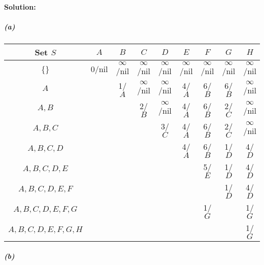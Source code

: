 \documentclass[12pt]{article}
\begin{document}
\paragraph{Solution:}
\subparagraph{(a)}

\begin{center}
\begin{tabular}{ | c | c | c | c | c | c | c | c | c |}
\hline
Set $S$ & $A$ & $B$ & $C$ & $D$ & $E$ & $F$ & $G$ & $H$ \\ \hline
\{\} & 0/nil & $\infty$/nil & $\infty$/nil & $\infty$/nil & $\infty$/nil
& $\infty$/nil & $\infty$/nil & $\infty$/nil \\ \hline
$A$ & & 1/$A$ & $\infty$/nil & $\infty$/nil & 4/$A$ & 6/$B$ & 6/$B$ & $\infty$/nil \\ \hline
$A,B$ & & & 2/$B$ & $\infty$/nil & 4/$A$ & 6/$B$ & 2/$C$ & $\infty$/nil \\ \hline
$A,B,C$ & & & & 3/$C$ & 4/$A$ & 6/$B$ & 2/$C$ & $\infty$/nil \\ \hline
$A,B,C,D$ & & & & & 4/$A$ & 6/$B$ & 1/$D$ & 4/$D$ \\ \hline
$A,B,C,D,E$ & & & & & & 5/$E$ & 1/$D$ & 4/$D$ \\ \hline
$A,B,C,D,E,F$ & & & & & & & 1/$D$ & 4/$D$ \\ \hline
$A,B,C,D,E,F,G$ & & & & & & 1/$G$ & & 1/$G$ \\ \hline
$A,B,C,D,E,F,G,H$ & & & & & & & & 1/$G$ \\ \hline
\end{tabular}
\end{center} 

\subparagraph{(b)}
\end{document}
